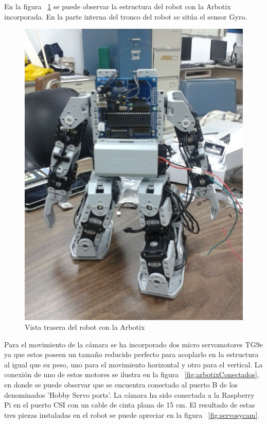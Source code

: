 En la figura ~\ref{fig:trasera2} se puede observar la estructura del robot con la Arbotix incorporada. En la parte interna del tronco del robot se sitúa el sensor Gyro.

\begin{figure}[hbtp]
\centering
\includegraphics[scale=0.2]{imagenes/traseroDeJunny.jpg}
\caption{Vista trasera del robot con la Arbotix}
\label{fig:trasera2}
\end{figure}

Para el movimiento de la cámara se ha incorporado dos micro servomotores TG9e ya que estos poseen un tama\~no reducido perfecto para acoplarlo en la estructura al igual que su peso, uno para el movimiento horizontal y otro para el vertical. La conexión de uno de estos motores se ilustra en la figura ~\ref{fig:arbotixConectados}, en donde se puede observar que se encuentra conectado al puerto B de los denominados 'Hobby Servo ports'. La cámara ha sido conectada a la Raspberry Pi en el puerto \gls{CSI} con un cable de cinta plana de 15 cm. El resultado de estas tres piezas instaladas en el robot se puede apreciar en la figura ~\ref{fig:servosycam}.

